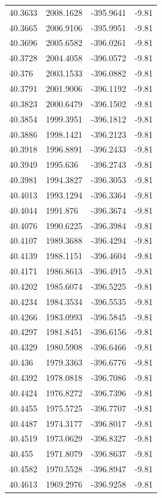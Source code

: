\begin{table}[H]
\begin{tabular}{llll}
40.3633 & 2008.1628 & -395.9641 & -9.81 \\
40.3665 & 2006.9106 & -395.9951 & -9.81 \\
40.3696 & 2005.6582 & -396.0261 & -9.81 \\
40.3728 & 2004.4058 & -396.0572 & -9.81 \\
40.376 & 2003.1533 & -396.0882 & -9.81 \\
40.3791 & 2001.9006 & -396.1192 & -9.81 \\
40.3823 & 2000.6479 & -396.1502 & -9.81 \\
40.3854 & 1999.3951 & -396.1812 & -9.81 \\
40.3886 & 1998.1421 & -396.2123 & -9.81 \\
40.3918 & 1996.8891 & -396.2433 & -9.81 \\
40.3949 & 1995.636 & -396.2743 & -9.81 \\
40.3981 & 1994.3827 & -396.3053 & -9.81 \\
40.4013 & 1993.1294 & -396.3364 & -9.81 \\
40.4044 & 1991.876 & -396.3674 & -9.81 \\
40.4076 & 1990.6225 & -396.3984 & -9.81 \\
40.4107 & 1989.3688 & -396.4294 & -9.81 \\
40.4139 & 1988.1151 & -396.4604 & -9.81 \\
40.4171 & 1986.8613 & -396.4915 & -9.81 \\
40.4202 & 1985.6074 & -396.5225 & -9.81 \\
40.4234 & 1984.3534 & -396.5535 & -9.81 \\
40.4266 & 1983.0993 & -396.5845 & -9.81 \\
40.4297 & 1981.8451 & -396.6156 & -9.81 \\
40.4329 & 1980.5908 & -396.6466 & -9.81 \\
40.436 & 1979.3363 & -396.6776 & -9.81 \\
40.4392 & 1978.0818 & -396.7086 & -9.81 \\
40.4424 & 1976.8272 & -396.7396 & -9.81 \\
40.4455 & 1975.5725 & -396.7707 & -9.81 \\
40.4487 & 1974.3177 & -396.8017 & -9.81 \\
40.4519 & 1973.0629 & -396.8327 & -9.81 \\
40.455 & 1971.8079 & -396.8637 & -9.81 \\
40.4582 & 1970.5528 & -396.8947 & -9.81 \\
40.4613 & 1969.2976 & -396.9258 & -9.81 \\

\end{tabular}
\end{table}
